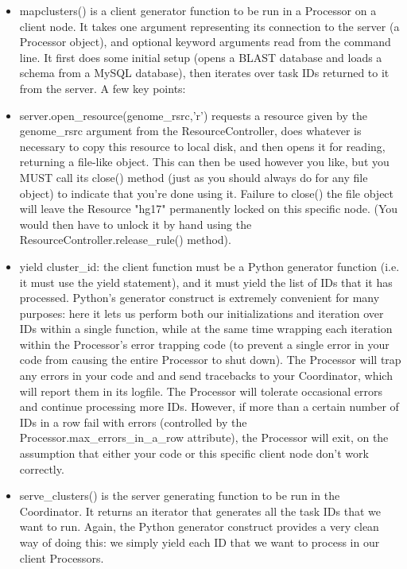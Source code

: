 \documentclass{howto}
\begin{document}
\begin{itemize}

\item
mapclusters() is a client generator function to be run in a Processor on a client node.  It takes one argument representing its connection to the server (a Processor object), and optional keyword arguments read from the command line.  It first does some initial setup (opens a BLAST database and loads a schema from a MySQL database), then iterates over task IDs returned to it from the server.  A few key points:

\item
server.open_resource(genome_rsrc,'r') requests a resource given by the genome_rsrc argument from the ResourceController, does whatever is necessary to copy this resource to local disk, and then opens it for reading, returning a file-like object.  This can then be used however you like, but you MUST call its close() method (just as you should always do for any file object) to indicate that you're done using it.  Failure to close() the file object will leave the Resource "hg17" permanently locked on this specific node.  (You would then have to unlock it by hand using the ResourceController.release_rule() method).

\item
yield cluster_id: the client function must be a Python generator function (i.e. it must use the yield statement), and it must yield the list of IDs that it has processed.  Python's generator construct is extremely convenient for many purposes: here it lets us perform both our initializations and iteration over IDs within a single function, while at the same time wrapping each iteration within the Processor's error trapping code (to prevent a single error in your code from causing the entire Processor to shut down).  The Processor will trap any errors in your code and and send tracebacks to your Coordinator, which will report them in its logfile.  The Processor will tolerate occasional errors and continue processing more IDs.  However, if more than a certain number of IDs in a row fail with errors (controlled by the Processor.max_errors_in_a_row attribute), the Processor will exit, on the assumption that either your code or this specific client node don't work correctly.

\item
serve_clusters() is the server generating function to be run in the Coordinator.  It returns an iterator that generates all the task IDs that we want to run.  Again, the Python generator construct provides a very clean way of doing this: we simply yield each ID that we want to process in our client Processors.


\end{itemize}
\end{document}
